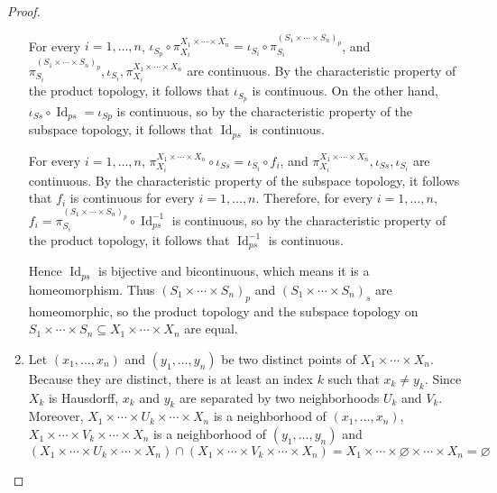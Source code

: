 \begin{proof}
\begin{enumerate}[label={(\alph*)}]
              For every $i=1,\ldots,n$, $\iota_{S_{p}}\circ \pi^{X_{1}\times\cdots\times X_{n}}_{X_{i}} = \iota_{S_{i}}\circ \pi^{{(S_{1}\times\cdots\times S_{n})}_{p}}_{S_{i}}$, and $\pi^{{(S_{1}\times\cdots\times S_{n})}_{p}}_{S_{i}}, \iota_{S_{i}}, \pi^{X_{1}\times\cdots\times X_{n}}_{X_{i}}$ are continuous. By the characteristic property of the product topology, it follows that $\iota_{S_{p}}$ is continuous. On the other hand, $\iota_{Ss}\circ \operatorname{Id}_{ps} = \iota_{Sp}$ is continuous, so by the characteristic property of the subspace topology, it follows that $\operatorname{Id}_{ps}$ is continuous.

              For every $i=1,\ldots,n$, $\pi^{X_{1}\times\cdots\times X_{n}}_{X_{i}}\circ \iota_{Ss} = \iota_{S_{i}}\circ f_{i}$, and $\pi^{X_{1}\times\cdots\times X_{n}}_{X_{i}}, \iota_{Ss}, \iota_{S_{i}}$ are continuous. By the characteristic property of the subspace topology, it follows that $f_{i}$ is continuous for every $i=1,\ldots,n$. Therefore, for every $i=1,\ldots,n$, $f_{i} = \pi^{{(S_{1}\times\cdots\times S_{n})}_{p}}_{S_{i}}\circ \operatorname{Id}_{ps}^{-1}$ is continuous, so by the characteristic property of the product topology, it follows that $\operatorname{Id}^{-1}_{ps}$ is continuous.

              Hence $\operatorname{Id}_{ps}$ is bijective and bicontinuous, which means it is a homeomorphism. Thus ${(S_{1}\times\cdots\times S_{n})}_{p}$ and ${(S_{1}\times\cdots\times S_{n})}_{s}$ are homeomorphic, so the product topology and the subspace topology on $S_{1}\times\cdots\times S_{n}\subseteq X_{1}\times\cdots\times X_{n}$ are equal.
        \item Let $(x_{1}, \ldots, x_{n})$ and $(y_{1}, \ldots, y_{n})$ be two distinct points of $X_{1}\times \cdots\times X_{n}$. Because they are distinct, there is at least an index $k$ such that $x_{k}\ne y_{k}$. Since $X_{k}$ is Hausdorff, $x_{k}$ and $y_{k}$ are separated by two neighborhoods $U_{k}$ and $V_{k}$. Moreover, $X_{1}\times\cdots \times U_{k}\times\cdots\times X_{n}$ is a neighborhood of $(x_{1}, \ldots, x_{n})$, $X_{1}\times\cdots \times V_{k}\times\cdots\times X_{n}$ is a neighborhood of $(y_{1}, \ldots, y_{n})$ and
              \[
                  (X_{1}\times\cdots \times U_{k}\times\cdots\times X_{n}) \cap (X_{1}\times\cdots \times V_{k}\times\cdots\times X_{n}) = X_{1}\times\cdots \times \varnothing\times\cdots\times X_{n} = \varnothing
              \]


\end{enumerate}
\end{proof}
